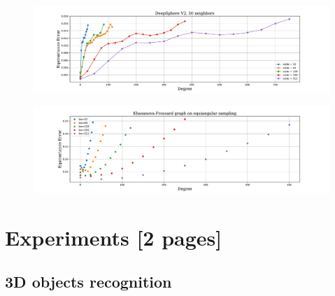 \documentclass{article} %
\begin{document}
\begin{figure}
	\centering
	\includegraphics[width=0.9\linewidth]{DeepSphereV2_50neighbors.pdf}
	\caption{}
	\label{fig:deepsphereV2}
\end{figure}
\begin{figure}
	\centering
	\includegraphics[width=0.9\linewidth]{khasanova_frossard.pdf}
	\caption{}
	\label{fig:khasanova_frossard}
\end{figure}


\section{Experiments [2 pages]}


\subsection{3D objects recognition} \label{sec:exp:objects}
\end{document}
